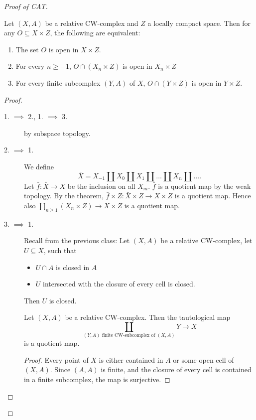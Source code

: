 \documentclass{TemplateLecture}
\begin{document}
\begin{proof}[Proof of CAT]
    \begin{corollary}
        Let \((X,A)\) be a relative CW-complex and \(Z\) a locally compact space. Then for any \(O \subseteq X \times Z\), the following are equivalent:
        \begin{enumerate}
            \item The set \(O\) is open in \(X\times Z\).
            \item For every \(n \geq -1\), \(O\cap (X_n \times Z)\) is open in \(X_n \times Z\)
            \item For every finite subcomplex \((Y,A)\) of \(X\), \(O\cap (Y \times Z)\) is open in \(Y \times Z\).
        \end{enumerate}
    \end{corollary}
    \begin{proof}\leavevmode
        \begin{description}
            \item[1. \(\implies\) 2., 1. \(\implies\) 3.] by subspace topology.
            \item[2. \(\implies\) 1.] We define
            \[\bar X = X_{-1} \amalg X_0 \amalg X_1 \amalg \dots \amalg X_n \amalg \dots.\]
            Let \(\bar f\colon \bar X \to X\) be the inclusion on all \(X_m\). \( \bar f\) is a quotient map by the weak topology.
            By the theorem, \(\bar f\times Z\colon \bar X \times Z \to X \times Z\) is a quotient map.
            Hence also \(\coprod_{n \geq 1} (X_n \times Z) \to X \times Z\) is a quotient map.
            \item[3. \(\implies\) 1.] Recall from the previous class: Let \((X,A)\) be a relative CW-complex, let \(U \subseteq X\), such that
            \begin{itemize}
                \item \(U\cap A\) is closed in \(A\)
                \item \(U\) intersected with the closure of every cell is closed.
            \end{itemize}
            Then \(U\) is closed.
            \begin{proposition}
                Let \((X,A)\) be a relative CW-complex. Then the tautological map
                \[\coprod_{(Y,A) \text{ finite CW-subcomplex of }(X,A)} Y \to X\]
                is a quotient map.
            \end{proposition}
            \begin{proof}
                Every point of \(X\) is either contained in \(A\) or some open cell of \((X,A)\). Since \((A,A)\) is finite, and the closure of every cell is contained in a finite subcomplex, the map is surjective.

\end{proof}
\end{description}
\end{proof}
\end{proof}
\end{document}
